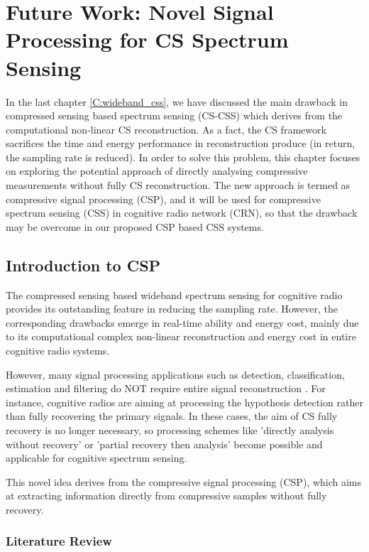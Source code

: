 \chapter{Future Work: Novel Signal Processing for CS Spectrum Sensing} 
\label{C:csp_css}

In the last chapter \ref{C:wideband_css}, we have discussed the main drawback in compressed sensing based spectrum sensing (CS-CSS) which derives from the computational non-linear CS reconstruction. As a fact, the CS framework sacrifices the time and energy performance in reconstruction produce (in return, the sampling rate is reduced). In order to solve this problem, this chapter focuses on exploring the potential approach of directly analysing compressive measurements without fully CS reconstruction. The new approach is termed as compressive signal processing (CSP), and it will be used for compressive spectrum sensing (CSS) in cognitive radio network (CRN), so that the drawback may be overcome in our proposed CSP based CSS systems. 

\section{Introduction to CSP}

The compressed sensing based wideband spectrum sensing for cognitive radio provides its outstanding feature in reducing the sampling rate. However, the corresponding drawbacks emerge in real-time ability and energy cost, mainly due to its computational complex non-linear reconstruction and energy cost in entire cognitive radio systems.  

However, many signal processing applications such as detection, classification, estimation and filtering do NOT require entire signal reconstruction \cite{davenport2010signal}. For instance, cognitive radios are aiming at processing the hypothesis detection rather than fully recovering the primary signals. In these cases, the aim of CS fully recovery is no longer necessary, so processing schemes like 'directly analysis without recovery' or 'partial recovery then analysis' become possible and applicable for cognitive spectrum sensing. 

This novel idea derives from the compressive signal processing (CSP)\cite{davenport2010signal}, which aims at extracting information directly from compressive samples without fully recovery.  

\subsection{Literature Review}

